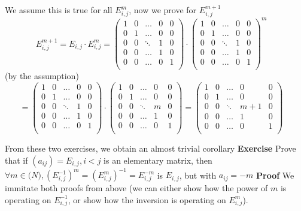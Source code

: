 \documentclass[12pt]{article}
\begin{document}
We assume this is true for all \( E_{i,j}^m \), now we prove for \( E_{i,j}^{m+1} \)
$$
	E_{i,j}^{m+1} = E_{i,j} \cdot E_{i,j}^{m}=\begin{pmatrix} 
	1 & 0 & \dots & 0 & 0 \\
	0 & 1 & \dots & 0 & 0 \\
	0 & 0 & \ddots & 1 & 0 \\
	0 & 0 & \dots & 1 & 0 \\
	0 & 0 & \dots & 0 & 1 \\
	\end{pmatrix} \cdot \begin{pmatrix} 
	1 & 0 & \dots & 0 & 0 \\
	0 & 1 & \dots & 0 & 0 \\
	0 & 0 & \ddots & 1 & 0 \\
	0 & 0 & \dots & 1 & 0 \\
	0 & 0 & \dots & 0 & 1 \\
	\end{pmatrix}^{m}
	\quad
	$$
(by the assumption)
$$
	=\begin{pmatrix} 
	1 & 0 & \dots & 0 & 0 \\
	0 & 1 & \dots & 0 & 0 \\
	0 & 0 & \ddots & 1 & 0 \\
	0 & 0 & \dots & 1 & 0 \\
	0 & 0 & \dots & 0 & 1 \\
	\end{pmatrix} \cdot \begin{pmatrix} 
	1 & 0 & \dots & 0 & 0 \\
	0 & 1 & \dots & 0 & 0 \\
	0 & 0 & \ddots & m & 0 \\
	0 & 0 & \dots & 1 & 0 \\
	0 & 0 & \dots & 0 & 1 \\
	\end{pmatrix}=\begin{pmatrix} 
	1 & 0 & \dots & 0 & 0 \\
	0 & 1 & \dots & 0 & 0 \\
	0 & 0 & \ddots & m+1 & 0 \\
	0 & 0 & \dots & 1 & 0 \\
	0 & 0 & \dots & 0 & 1 \\
	\end{pmatrix}
	\quad
	$$

From these two exercises, we obtain an almost trivial corollary \newline
\textbf{Exercise} Prove that if \( (a_{ij})=E_{i,j}, i<j \) is an elementary matrix, \newline
then \( \forall m \in \mathbb(N), (E_{i,j}^{-1})^m=(E_{i,j}^m)^{-1}=E_{i,j}^{-m} \) is \(E_{i,j} \), but with \( a_{ij}=-m \) \newline \newline
\textbf{Proof} We immitate both proofs from above (we can either show how the power of \( m \) is operating on \( E_{i,j}^{-1} \), 
 or show how the inversion is operating on \( E_{i,j}^m \)). \newline
\end{document}
